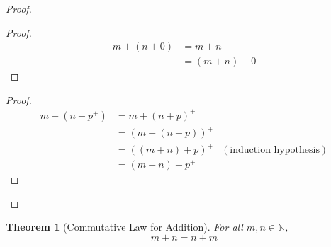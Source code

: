 \documentclass{book}
\let\qed\relax
\newtheorem{thm}[ax]{Theorem}
\theoremstyle{definition}
\begin{document}
\begin{proof}
\pf
{}
\begin{proof}
	\pf
	\begin{align*}
		m + (n + 0) & = m + n \\
		& = (m + n) + 0
	\end{align*}
\end{proof}
\begin{proof}
	\pf
	\begin{align*}
		m + (n + p^+) & = m + (n + p)^+ \\
		& = (m + (n + p))^+ \\
		& = ((m + n) + p)^+ & (\text{induction hypothesis}) \\
		& = (m + n) + p^+
	\end{align*}
\end{proof}
\qed
\end{proof}

\begin{thm}[Commutative Law for Addition]
\label{thm:pluscomm}
For all $m,n \in \mathbb{N}$,
\[ m + n = n + m \]
\end{thm}
\end{document}
